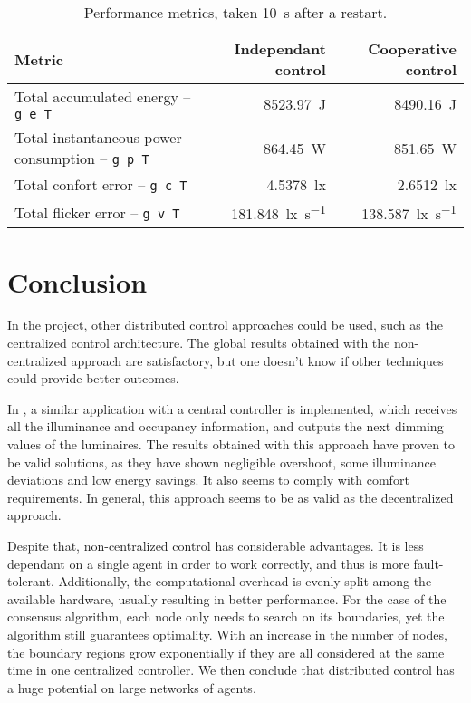 \documentclass[english,fira]{ist-report}
\begin{document}
\begin{table}[ht]
    \centering
    \begin{tabular}{l|r|r}
        Metric & Independant control & Cooperative control \\
        \hline
        Total accumulated energy -- \texttt{g e T}              & \SI{8523.97}{\joule} & \SI{8490.16}{\joule} \\
        Total instantaneous power consumption -- \texttt{g p T} & \SI{864.45}{\watt}   & \SI{851.65}{\watt}  \\
        Total confort error -- \texttt{g c T}                   & \SI{4.5378}{\lux}  & \SI{2.6512}{\lux}  \\
        Total flicker error -- \texttt{g v T}                   & \SI{181.848}{\lux\per\second} & \SI{138.587}{\lux\per\second}
    \end{tabular}
    \caption{Performance metrics, taken \SI{10}{\second} after a restart.}
    \label{tab:metrics}
\end{table}

\section{Conclusion}


In the project, other distributed control approaches could be used, such as the centralized control architecture. The global results obtained with the non-centralized approach are satisfactory, but one doesn't know if other techniques could provide better outcomes. 

In \cite{pandharipande2015centralized}, a similar application with a central controller is implemented, which receives all the illuminance and occupancy information, and outputs the next dimming values of the luminaires. The results obtained with this approach have proven to be valid solutions, as they have shown negligible overshoot, some illuminance deviations and low energy savings. It also seems to comply with comfort requirements. In general, this approach seems to be as valid as the decentralized approach.

Despite that, non-centralized control has considerable advantages. It is less dependant on a single agent in order to work correctly, and thus is more fault-tolerant. Additionally, the computational overhead is evenly split among the available hardware, usually resulting in better performance. For the case of the consensus algorithm, each node only needs to search on its boundaries, yet the algorithm still guarantees optimality. With an increase in the number of nodes, the boundary regions grow exponentially if they are all considered at the same time in one centralized controller. We then conclude that distributed control has a huge potential on large networks of agents.
\end{document}
